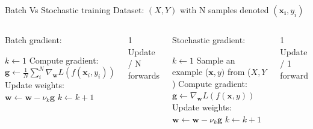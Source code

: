 \documentclass[handout, 10pt]{beamer}
\begin{document}
\begin{frame}{Batch Vs Stochastic training}
Dataset: $(X,Y)$ with N samples denoted $(\mathbf{x_i},y_i)$

\begin{columns}[t]
\begin{footnotesize}
\begin{block}{Batch gradient:}\end{block}
    \begin{algorithmic}
    \State $k \leftarrow 1$
    \State Compute gradient: $\mathbf{g} \leftarrow \frac{1}{N}\sum_i^N\nabla_\mathbf{w}L(f(\mathbf{x}_i,y_i))$
    \State Update weights: $\mathbf{w} \leftarrow \mathbf{w} - \nu_k\mathbf{g}$
    \State $k \leftarrow k + 1$
    \EndWhile 
    \end{algorithmic}
    \end{footnotesize}
    \alert{1 Update / N forwards}
    \pause
\begin{footnotesize}
\begin{block}{Stochastic gradient:}\end{block}
    \begin{algorithmic}
    \State $k \leftarrow 1$
    \State Sample an example ($\mathbf{x},y)$ from ($X,Y$)
    \State Compute gradient: $\mathbf{g} \leftarrow \nabla_\mathbf{w}L(f(\mathbf{x},y))$
    \State Update weights: $\mathbf{w} \leftarrow \mathbf{w} - \nu_k\mathbf{g}$
    \State $k \leftarrow k + 1$
    \EndWhile 
    \end{algorithmic}
    \end{footnotesize}
    \alert{1 Update / 1 forward}
    
    
    \end{columns}
\end{frame}
\end{document}
